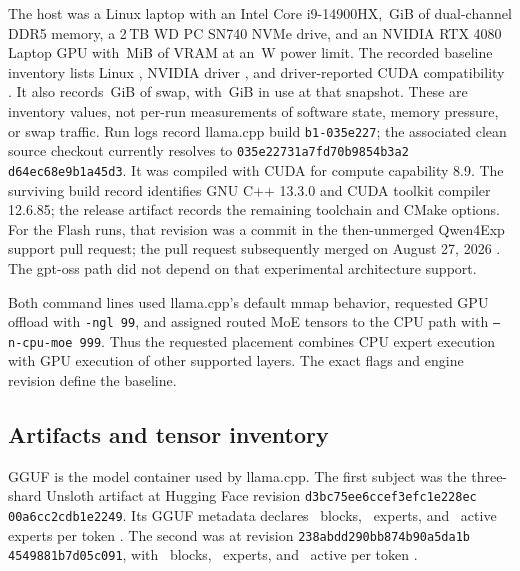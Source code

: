 \documentclass[11pt]{article}
\newcommand{\q}[1]{\texttt{#1}}
\begin{document}
The host was a Linux laptop with an Intel Core i9-14900HX,
\PthreeCpuRamGiB\,GiB of
dual-channel DDR5 memory, a 2\,TB WD PC SN740 NVMe drive, and an NVIDIA RTX
4080 Laptop GPU with \PthreeGpuVramMiB\,MiB of VRAM at an
\PthreeGpuPowerCapWatts\,W power limit. The recorded baseline inventory lists
Linux \q{\PthreeKernelVersion}, NVIDIA driver
\q{\PthreeNvidiaDriverVersion}, and driver-reported CUDA compatibility
\q{\PthreeCudaVersion}. It also
records \PthreeSwapTotalGiB\,GiB of swap, with
\PthreeSwapUsedBaselineGiB\,GiB in use at that snapshot. These are inventory
values, not per-run measurements of software state, memory pressure, or swap
traffic. Run logs
record llama.cpp build \q{b1-035e227}; the associated clean source checkout
currently resolves to
\q{035e2273}\allowbreak\q{1a7fd70b}\allowbreak\q{9854b3a2}\allowbreak
\q{d64ec68e}\allowbreak\q{9b1a45d3}. It was compiled with CUDA for
compute capability 8.9. The surviving build record identifies GNU C++ 13.3.0
and CUDA toolkit compiler 12.6.85; the release artifact records the remaining
toolchain and CMake options. For the Flash runs, that revision was a commit in the
then-unmerged Qwen4Exp support pull request; the pull request subsequently
merged on August 27, 2026 \citep{llamacpp2026qwen4exppr}. The gpt-oss path did
not depend on that experimental architecture support.

Both command lines used llama.cpp's default mmap behavior, requested GPU
offload with \q{-ngl 99}, and assigned routed MoE tensors to the CPU path with
\q{--n-cpu-moe 999}. Thus the requested placement combines CPU expert
execution with GPU execution of other supported layers. The exact flags and
engine revision define the baseline.

\subsection{Artifacts and tensor inventory}

GGUF is the model container used by llama.cpp. The first subject was the
three-shard Unsloth
 artifact at Hugging Face revision
\q{d3bc75ee}\allowbreak\q{6ccef3ef}\allowbreak\q{c1e228ec}\allowbreak
\q{00a6cc2c}\allowbreak\q{db1e2249}. Its GGUF metadata declares
\PthreeFlashLayers\ blocks, \PthreeFlashExperts\ experts, and
\PthreeFlashActiveExperts\ active experts per token
\citep{qwenflash2026,unsloth2026flashnext}. The second was
 at revision
\q{238abdd2}\allowbreak\q{90bb874b}\allowbreak\q{90a5da1b}\allowbreak
\q{4549881b}\allowbreak\q{7d05c091}, with \PthreeGptOssLayers\
blocks, \PthreeGptOssExperts\ experts, and \PthreeGptOssActiveExperts\ active
per token \citep{openai2025gptoss,ggmlorg2025gptossgguf}.
\end{document}
